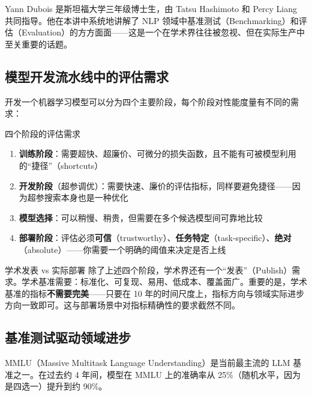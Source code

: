 \documentclass[a4paper]{article}
\begin{document}
Yann Dubois 是斯坦福大学三年级博士生，由 Tatsu Hashimoto 和 Percy Liang 共同指导。他在本讲中系统地讲解了 NLP 领域中基准测试（Benchmarking）和评估（Evaluation）的方方面面——这是一个在学术界往往被忽视、但在实际生产中至关重要的话题。





\subsection{模型开发流水线中的评估需求}

开发一个机器学习模型可以分为四个主要阶段，每个阶段对性能度量有不同的需求：





\begin{importantbox}{四个阶段的评估需求}
\begin{enumerate}
    \item \textbf{训练阶段}：需要超快、超廉价、可微分的损失函数，且不能有可被模型利用的``捷径''（shortcuts）
    \item \textbf{开发阶段}（超参调优）：需要快速、廉价的评估指标，同样要避免捷径——因为超参搜索本身也是一种优化
    \item \textbf{模型选择}：可以稍慢、稍贵，但需要在多个候选模型间可靠地比较
    \item \textbf{部署阶段}：评估必须\textbf{可信}（trustworthy）、\textbf{任务特定}（task-specific）、\textbf{绝对}（absolute）——你需要一个明确的阈值来决定是否上线
\end{enumerate}
\end{importantbox}

\begin{knowledgebox}{学术发表 vs 实际部署}
除了上述四个阶段，学术界还有一个``发表''（Publish）需求。学术基准需要：标准化、可复现、易用、低成本、覆盖面广。重要的是，学术基准的指标\textbf{不需要完美}——只要在 10 年的时间尺度上，指标方向与领域实际进步方向一致即可。这与部署场景中对指标精确性的要求截然不同。
\end{knowledgebox}

\subsection{基准测试驱动领域进步}

MMLU（Massive Multitask Language Understanding）是当前最主流的 LLM 基准之一。在过去约 4 年间，模型在 MMLU 上的准确率从 25\%（随机水平，因为是四选一）提升到约 90\%。
\end{document}
